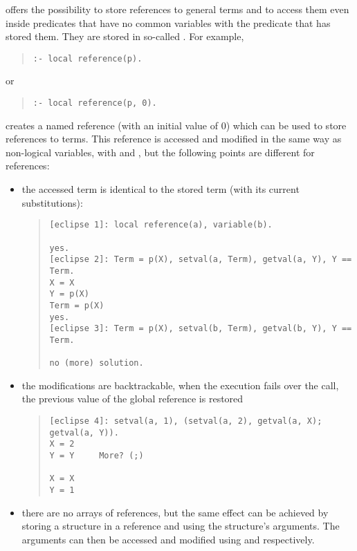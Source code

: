 {\eclipse} offers the possibility to store references to general terms
and to access them even inside predicates that have no common variables
with the predicate that has stored them.
They are stored in so-called .%
For example,
\begin{quote}
\begin{verbatim}
:- local reference(p).
\end{verbatim}
\end{quote}
or
\begin{quote}
\begin{verbatim}
:- local reference(p, 0).
\end{verbatim}
\end{quote}
creates a named reference  (with an initial value of 0)
which can be used to store references to terms.
This reference is accessed and modified in the same way as non-logical
variables,
with 
and ,
but the following points are different for references:
\begin{itemize}
\item the accessed term is identical to the stored term (with its current
substitutions):
\begin{quote}
\begin{verbatim}
[eclipse 1]: local reference(a), variable(b).

yes.
[eclipse 2]: Term = p(X), setval(a, Term), getval(a, Y), Y == Term.
X = X
Y = p(X)
Term = p(X)
yes.
[eclipse 3]: Term = p(X), setval(b, Term), getval(b, Y), Y == Term.

no (more) solution.
\end{verbatim}
\end{quote}

\item the modifications are backtrackable, when the execution fails
over the  call, the
previous value of the global reference is restored

\begin{quote}
\begin{verbatim}
[eclipse 4]: setval(a, 1), (setval(a, 2), getval(a, X); getval(a, Y)).
X = 2
Y = Y     More? (;)

X = X
Y = 1
\end{verbatim}
\end{quote}

\item there are no arrays of references, but the same effect can be
achieved by storing a structure in a reference and using the structure's
arguments. The arguments can then be accessed and modified using
 and
 respectively.
\end{itemize}


